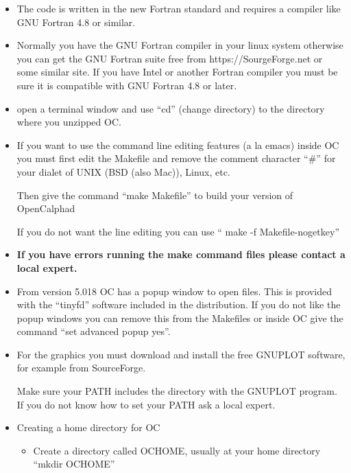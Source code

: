 \documentclass[12pt]{article}
\begin{document}
\begin{itemize}
\item The code is written in the new Fortran standard and requires a
  compiler like GNU Fortran 4.8 or similar.

\item Normally you have the GNU Fortran compiler in your linux system
  otherwise you can get the GNU Fortran suite free from
  https://SourgeForge.net or some similar site.  If you have Intel or
  another Fortran compiler you must be sure it is compatible with GNU
  Fortran 4.8 or later.

\item open a terminal window and use ``cd'' (change directory) to the
  directory where you unzipped OC.

\item If you want to use the command line editing features (a la
  emacs) inside OC you must first edit the Makefile and remove the
  comment character ``\#'' for your dialet of UNIX (BSD (also Mac)),
  Linux, etc.

  Then give the command ``make Makefile'' to build your version of OpenCalphad

  If you do not want the line editing you can use `` make -f Makefile-nogetkey''
  
\item {\bf If you have errors running the make command files please
    contact a local expert.}

\item From version 5.018 OC has a popup window to open files.  This is
  provided with the ``tinyfd'' software included in the distribution.
  If you do not like the popup windows you can remove this from the
  Makefiles or inside OC give the command ``set advanced popup yes''.
  
\item For the graphics you must download and install the free GNUPLOT
  software, for example from SourceForge.

  Make sure your PATH includes the directory with the GNUPLOT program.
  If you do not know how to set your PATH ask a local expert.

\item Creating a home directory for OC

  \begin{itemize}
  \item Create a directory called OCHOME, usually at your home
    directory ``mkdir OCHOME''


\end{itemize}
\end{itemize}
\end{document}
